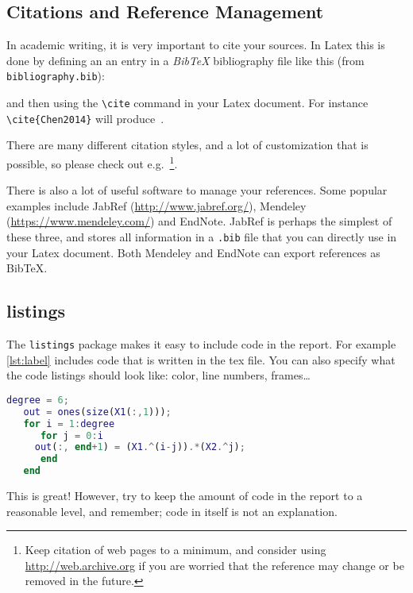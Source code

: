\subsection{Citations and Reference Management}
In academic writing, it is very important to cite your sources. In Latex this is done by defining an an entry in a \emph{BibTeX} bibliography file like this (from \texttt{bibliography.bib}):

and then using the \texttt{\textbackslash{cite}} command in your Latex document. For instance \texttt{\textbackslash{cite}\{Chen2014\}} will produce~\cite{Chen2014}.

There are many different citation styles, and a lot of customization that is possible, so please check out e.g.~\cite{BiberBibtexEtc,WikibookLatex}\footnote{Keep citation of web pages to a minimum, and consider using \url{http://web.archive.org} if you are worried that the reference may change or be removed in the future.}.

There is also a lot of useful software to manage your references. Some popular examples include JabRef (\url{http://www.jabref.org/}), Mendeley (\url{https://www.mendeley.com/}) and EndNote. JabRef is perhaps the simplest of these three, and stores all information in a \texttt{.bib} file that you can directly use in your Latex document. Both Mendeley and EndNote can export references as BibTeX.

\subsection{listings}
 The \texttt{listings} package makes it easy to include code in the report. For example \cref{lst:label} includes code that is written in the tex file. You can also specify what the code listings should look like: color, line numbers, frames\ldots
 
 \begin{lstlisting}[caption={Some Matlab code, with the source in the tex file},label={lst:label},language=Matlab, float]
   degree = 6;
   out = ones(size(X1(:,1)));
   for i = 1:degree
      for j = 0:i
	 out(:, end+1) = (X1.^(i-j)).*(X2.^j);
      end
   end
 \end{lstlisting}
 This is great! However, try to keep the amount of code in the report to a reasonable level, and remember; code in itself is not an explanation.
 
